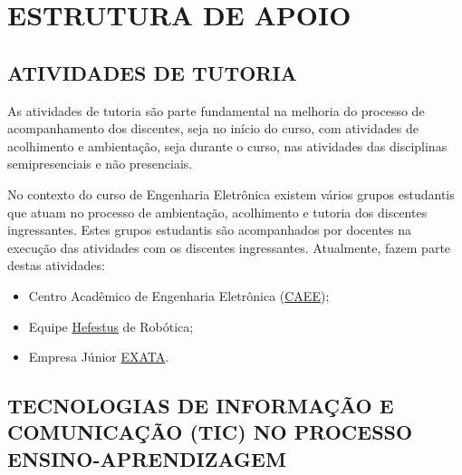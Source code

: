 \chapter{ESTRUTURA DE APOIO}


\section{ATIVIDADES DE TUTORIA}

As atividades de tutoria são parte fundamental na melhoria do processo de acompanhamento dos discentes, seja no início do curso, com atividades de acolhimento e ambientação, seja durante o curso, nas atividades das disciplinas semipresenciais e não presenciais.

No contexto do curso de Engenharia Eletrônica existem vários grupos estudantis que atuam no processo de ambientação, acolhimento e tutoria dos discentes ingressantes. Estes grupos estudantis são acompanhados por docentes na execução das atividades com os discentes ingressantes. Atualmente, fazem parte destas atividades:

\begin{itemize}
    \item Centro Acadêmico de Engenharia Eletrônica (\href{facebook.com/caee.utf.td}{CAEE});
    \item Equipe \href{facebook.com/hefestus.utfpr}{Hefestus} de Robótica;
    \item Empresa Júnior \href{exata.org.br}{EXATA}.
\end{itemize}
    

\section{TECNOLOGIAS DE INFORMAÇÃO E COMUNICAÇÃO (TIC) NO PROCESSO ENSINO-APRENDIZAGEM}
\label{sec:tic}


